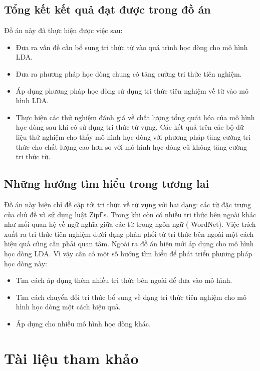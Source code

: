 \documentclass[fontsize=13pt]{scrartcl}
\begin{document}
\subsection{Tổng kết kết quả đạt được trong đồ án}
Đồ án này đã thực hiện được việc sau: 
\begin{itemize}
\item Đưa ra vấn đề cần bổ sung tri thức từ vào quá trình học dòng cho mô hình LDA.
\item Đưa ra phương pháp học dòng chung có tăng cường tri thức tiên nghiệm.
\item Áp dụng phương pháp học dòng sử dụng tri thức tiên nghiệm về từ vào mô hình LDA.
\item Thực hiện các thử nghiệm đánh giá về chất lượng tổng quát hóa của mô hình học dòng sau khi có sử dụng tri thức từ vựng. Các kết quả trên các bộ dữ liệu thử nghiệm cho thấy mô hình học dòng với phương pháp tăng cường tri thức cho chất lượng cao hơn so với mô hình học dòng cũ không tăng cường tri thức từ.
\end{itemize}

\subsection{Những hướng tìm hiểu trong tương lai}
Đồ án này hiện chỉ đề cập tới tri thức về từ vựng với hai dạng: các từ đặc trưng của chủ đề và sử dụng luật Zipf's. Trong khi còn có nhiều tri thức bên ngoài khác như mối quan hệ về ngữ nghĩa giữa các từ trong ngôn ngữ ( WordNet). Việc trích xuất ra tri thức tiên nghiệm dưới dạng phân phối từ tri thức bên ngoài một cách hiệu quả cũng cần phải quan tâm. Ngoài ra đồ án hiện mới áp dụng cho mô hình học dòng LDA. Vì vậy cần có một số hướng tìm hiểu để phát triển phương pháp học dòng này:
\begin{itemize}
\item Tìm cách áp dụng thêm nhiều tri thức bên ngoài để đưa vào mô hình.
\item Tìm cách chuyển đổi tri thức bổ sung về dạng tri thức tiên nghiệm cho mô hình học dòng một cách hiệu quả.
\item Áp dụng cho nhiều mô hình học dòng khác.
\end{itemize}
\newpage
\section{Tài liệu tham khảo}
\label{sec:partVII}

{}
\end{document}
